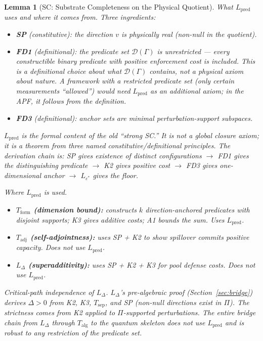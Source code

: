 \documentclass[11pt,a4paper]{article}
\newtheorem{lemma}[theorem]{Lemma}
\theoremstyle{definition}
\newcommand{\eps}{\varepsilon}
\begin{document}
\begin{lemma}[SC: Substrate Completeness on the Physical Quotient]
\noindent\textit{What $L_{\mathrm{pred}}$ uses and where it comes from.}  Three ingredients:
\begin{itemize}[nosep,leftmargin=2em,itemsep=3pt]
\item \textbf{SP} (constitutive): the direction $v$ is physically real (non-null in the quotient).
\item \textbf{FD1} (definitional): the predicate set $\mathcal{D}(\Gamma)$ is \emph{unrestricted} --- every constructible binary predicate with positive enforcement cost is included.  This is a definitional choice about what $\mathcal{D}(\Gamma)$ contains, not a physical axiom about nature.  A framework with a restricted predicate set (only certain measurements ``allowed'') would need $L_{\mathrm{pred}}$ as an additional axiom; in the APF, it follows from the definition.
\item \textbf{FD3} (definitional): anchor sets are minimal perturbation-support subspaces.
\end{itemize}
$L_{\mathrm{pred}}$ is the formal content of the old ``strong SC.''  It is not a global closure axiom; it is a theorem from three named constitutive/definitional principles.  The derivation chain is: SP gives existence of distinct configurations $\to$ FD1 gives the distinguishing predicate $\to$ K2 gives positive cost $\to$ FD3 gives one-dimensional anchor $\to$ $L_{\eps^*}$ gives the floor.

\smallskip\noindent\textit{Where $L_{\mathrm{pred}}$ is used.}
\begin{itemize}[nosep,leftmargin=2em,itemsep=3pt]
\item \textbf{$T_{\mathrm{form}}$ (dimension bound):} constructs $k$ direction-anchored predicates with disjoint supports; K3 gives additive costs; A1 bounds the sum.  Uses $L_{\mathrm{pred}}$.
\item \textbf{$T_{\mathrm{adj}}$ (self-adjointness):} uses SP + K2 to show spillover commits positive capacity.  Does \emph{not} use $L_{\mathrm{pred}}$.
\item \textbf{$L_\Delta$ (superadditivity):} uses SP + K2 + K3 for pool defense costs.  Does \emph{not} use $L_{\mathrm{pred}}$.
\end{itemize}

\smallskip\noindent\textit{Critical-path independence of $L_\Delta$.}  $L_\Delta$'s pre-algebraic proof (Section~\ref{sec:bridge}) derives $\Delta > 0$ from K2, K3, $T_{\mathrm{sep}}$, and SP (non-null directions exist in $\Pi$).  The strictness comes from K2 applied to $\Pi$-supported perturbations.  The entire bridge chain from $L_\Delta$ through $T_{\mathrm{alg}}$ to the quantum skeleton does not use $L_{\mathrm{pred}}$ and is robust to any restriction of the predicate set.


\end{lemma}
\end{document}
